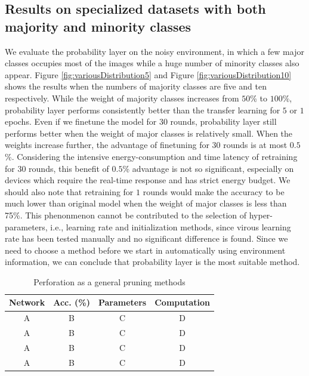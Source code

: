 \documentclass[pageno]{jpaper}
\begin{document}
\subsection{Results on specialized datasets with both majority and minority classes}
We evaluate the probability layer on the noisy environment, in which a few major classes occupies most of the images while a huge number of minority classes also appear. Figure \ref{fig:variousDistribution5} and Figure \ref{fig:variousDistribution10} shows the results when the numbers of majority classes are five and ten respectively. While the weight of majority classes increases from $50$\% to $100$\%, probability layer performs consistently better than the transfer learning for $5$ or $1$ epochs. Even if we finetune the model for $30$ rounds, probability layer still performs better when the weight of major classes is relatively small. When the weights increase further, the advantage of finetuning for $30$ rounds is at most $0.5$\%. Considering the intensive energy-consumption and time latency of retraining for $30$ rounds, this benefit of $0.5$\% advantage is not so significant, especially on devices which require the real-time response and has strict energy budget. We should also note that retraining for $1$ rounds would make the accuracy to be much lower than original model when the weight of major classes is less than 75\%. This phenonmenon cannot be contributed to the selection of hyper-parameters, i.e., learning rate and initialization methods, since virous learning rate has been tested manually and no significant difference is found. Since we need to choose a method before we start in automatically using environment information, we can conclude that probability layer is the most suitable method.




\begin{table}
    \caption{Perforation as a general pruning methods}
    \label{tab:generalPrune}

    \centering
    \begin{tabular}{ c|c|cc } 
     \hline
     Network & Acc. (\%) & Parameters & Computation \\ 
     \hline
     A & B & C & D \\
     A & B & C & D \\
     A & B & C & D \\
     A & B & C & D \\
     \hline
    \end{tabular}
\end{table}
\end{document}
